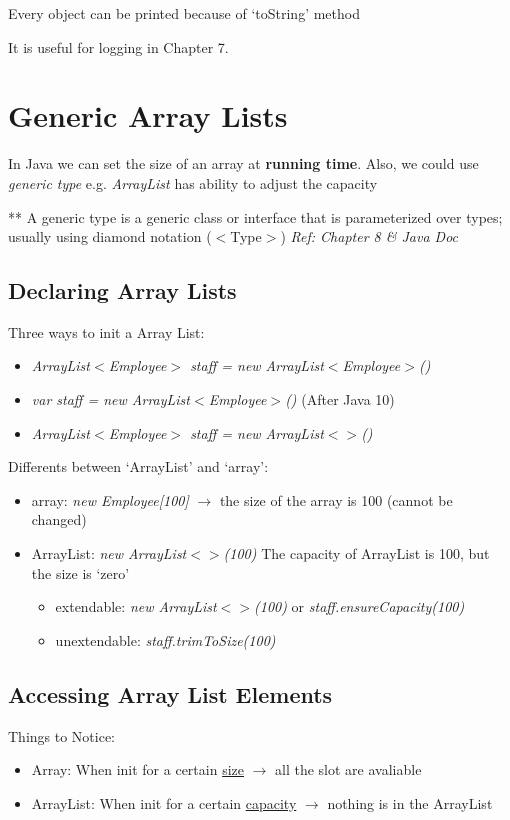 \documentclass[12pt]{article}
\begin{document}
Every object can be printed because of `toString' method

It is useful for logging in Chapter 7.

\section{Generic Array Lists}
In Java we can set the size of an array at \textbf{running time}.
Also, we could use \textit{generic type} e.g. \emph{ArrayList} has ability to adjust the capacity

** A generic type is a generic class or interface that is parameterized over types; usually using diamond notation ($<$Type$>$)\newline
\emph{Ref: Chapter 8 \& Java Doc}

\subsection{Declaring Array Lists}
Three ways to init a Array List:
\begin{itemize}
    \item \textit{ArrayList$<$Employee$>$ staff = new ArrayList$<$Employee$>$()}
    \item \textit{var staff = new ArrayList$<$Employee$>$()} (After Java 10)
    \item \textit{ArrayList$<$Employee$>$ staff = new ArrayList$<>$()}
\end{itemize}

Differents between `ArrayList' and `array':
\begin{itemize}
    \item array: \emph{new Employee[100]} $\rightarrow$ the size of the array is 100 (cannot be changed)
    \item ArrayList: \emph{new ArrayList$<>$(100)} The capacity of ArrayList is 100, but the size is `zero'
    \begin{itemize}
        \item extendable: \emph{new ArrayList$<>$(100)} or \emph{staff.ensureCapacity(100)}
        \item unextendable: \emph{staff.trimToSize(100)} 
    \end{itemize}
\end{itemize}

\subsection{Accessing Array List Elements}
Things to Notice:
\begin{itemize}
    \item Array: When init for a certain \underline{size} $\rightarrow$ all the slot are avaliable
    \item ArrayList: When init for a certain \underline{capacity} $\rightarrow$ nothing is in the ArrayList
\end{itemize}
\end{document}
